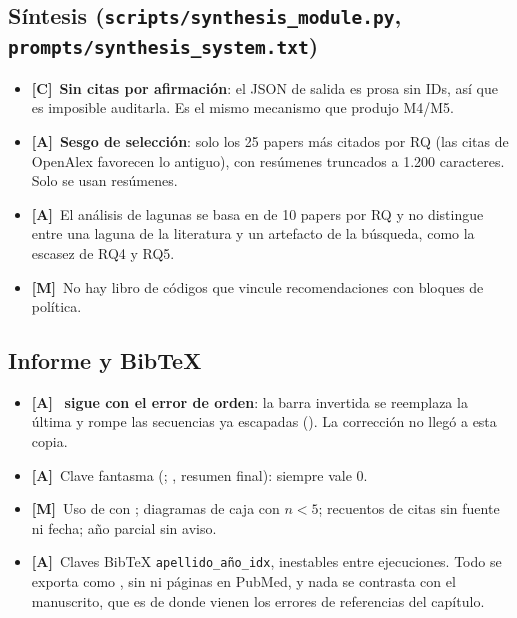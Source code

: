 \documentclass[11pt,a4paper]{article}
\newcommand{\sevC}{\textcolor{crit}{\textbf{[C]}}}
\newcommand{\sevA}{\textcolor{alto}{\textbf{[A]}}}
\newcommand{\sevM}{\textcolor{medio}{\textbf{[M]}}}
\begin{document}
\subsection{Síntesis (\texttt{scripts/synthesis\_module.py}, \texttt{prompts/synthesis\_system.txt})}
\begin{itemize}
  \item \sevC~\textbf{Sin citas por afirmación}: el JSON de salida es prosa sin IDs, así que es imposible auditarla. Es el mismo mecanismo que produjo M4/M5.
  \item \sevA~\textbf{Sesgo de selección}: solo los 25 papers más citados por RQ (las citas de OpenAlex favorecen lo antiguo), con resúmenes truncados a 1.200 caracteres. Solo se usan resúmenes.
  \item \sevA~El análisis de lagunas se basa en  de 10 papers por RQ y no distingue entre una laguna de la literatura y un artefacto de la búsqueda, como la escasez de RQ4 y RQ5.
  \item \sevM~No hay libro de códigos que vincule recomendaciones con bloques de política.
\end{itemize}

\subsection{Informe y BibTeX}
\begin{itemize}
  \item \sevA~\textbf{ sigue con el error de orden}: la barra invertida se reemplaza la última y rompe las secuencias ya escapadas (). La corrección no llegó a esta copia.
  \item \sevA~Clave fantasma  (; , resumen final): siempre vale 0.
  \item \sevM~Uso de  con ; diagramas de caja con $n<5$; recuentos de citas sin fuente ni fecha; año parcial sin aviso.
  \item \sevA~Claves BibTeX \texttt{apellido\_año\_idx}, inestables entre ejecuciones. Todo se exporta como , sin  ni páginas en PubMed, y nada se contrasta con el manuscrito, que es de donde vienen los errores de referencias del capítulo.
\end{itemize}
\end{document}

